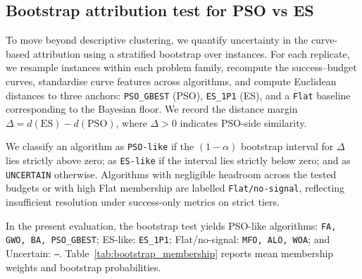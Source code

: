 \subsection{Bootstrap attribution test for PSO vs ES}
\label{subsec:bootstrap_attribution}

To move beyond descriptive clustering, we quantify uncertainty in the curve-based attribution using a stratified bootstrap over instances. For each replicate, we resample instances within each problem family, recompute the success--budget curves, standardise curve features across algorithms, and compute Euclidean distances to three anchors: \texttt{PSO_GBEST} (PSO), \texttt{ES_1P1} (ES), and a \texttt{Flat} baseline corresponding to the Bayesian floor. We record the distance margin $\Delta = d(\mathrm{ES}) - d(\mathrm{PSO})$, where $\Delta>0$ indicates PSO-side similarity.

We classify an algorithm as \texttt{PSO-like} if the $(1-\alpha)$ bootstrap interval for $\Delta$ lies strictly above zero; as \texttt{ES-like} if the interval lies strictly below zero; and as \texttt{UNCERTAIN} otherwise. Algorithms with negligible headroom across the tested budgets or with high Flat membership are labelled \texttt{Flat/no-signal}, reflecting insufficient resolution under success-only metrics on strict tiers.

In the present evaluation, the bootstrap test yields PSO-like algorithms: \texttt{FA, GWO, BA, PSO_GBEST}; ES-like: \texttt{ES_1P1}; Flat/no-signal: \texttt{MFO, ALO, WOA}; and Uncertain: \texttt{---}. Table~\ref{tab:bootstrap_membership} reports mean membership weights and bootstrap probabilities.
